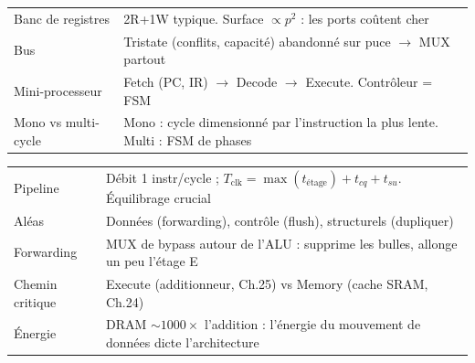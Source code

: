 \documentclass[12pt,a4paper,twoside]{book}
\begin{document}
\begin{approfondissement}[title={\color{white} Résumé --- Approfondissement}]
\begin{center}
\renewcommand{\arraystretch}{1.3}
\begin{tabular}{p{3.5cm}p{9.5cm}}
\toprule
Banc de registres & 2R+1W typique. Surface $\propto p^2$ : les ports coûtent cher \\
Bus & Tristate (conflits, capacité) abandonné sur puce $\to$ MUX partout \\
Mini-processeur & Fetch (PC, IR) $\to$ Decode $\to$ Execute. Contrôleur = FSM \\
Mono vs multi-cycle & Mono : cycle dimensionné par l'instruction la plus lente. Multi : FSM de phases \\
\bottomrule
\end{tabular}
\end{center}
\end{approfondissement}

\begin{ingenieur}[title={\color{white} Résumé --- Niveau Ingénieur}]
\begin{center}
\renewcommand{\arraystretch}{1.3}
\begin{tabular}{p{3.5cm}p{9.5cm}}
\toprule
Pipeline & Débit 1 instr/cycle ; $T_{\text{clk}} = \max(t_{\text{étage}}) + t_{cq} + t_{su}$. Équilibrage crucial \\
Aléas & Données (forwarding), contrôle (flush), structurels (dupliquer) \\
Forwarding & MUX de bypass autour de l'ALU : supprime les bulles, allonge un peu l'étage E \\
Chemin critique & Execute (additionneur, Ch.25) vs Memory (cache SRAM, Ch.24) \\
Énergie & DRAM $\sim 1000\times$ l'addition : l'énergie du mouvement de données dicte l'architecture \\
\bottomrule
\end{tabular}
\end{center}
\end{ingenieur}

\end{document}
